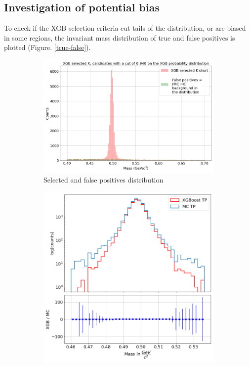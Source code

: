 \documentclass[12pt,a4paper]{report}
\begin{document}
\subsection{Investigation of potential bias}
To check if the XGB selection criteria cut tails of the distribution, or are biased in some regions, the invariant mass distribution of true and false positives is plotted (Figure. \ref{true-false}).
\begin{figure}[h!]
 \centering
    \begin{subfigure}[b]{0.79\linewidth} 
        \centering
        \includegraphics[width=\textwidth]{images/true_and_false_signal.png} 
        \caption{Selected \PKshort and false positives distribution} 
        \vspace{0.3cm}
    \end{subfigure}
     \hfill
       \begin{subfigure}[b]{0.69\linewidth}
        \centering
        \includegraphics[width=\textwidth]{images/efficiency_plot_mass.png} 

\end{subfigure}
\end{figure}
\end{document}
